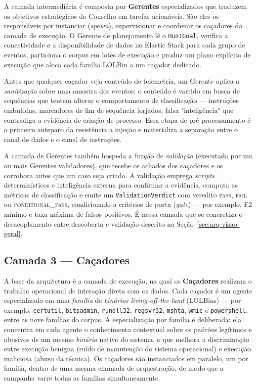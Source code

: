 A camada intermediária é composta por \textbf{Gerentes} especializados que
traduzem os objetivos estratégicos do Conselho em tarefas acionáveis. São eles os
responsáveis por instanciar (\emph{spawn}), supervisionar e coordenar os
caçadores da camada de execução. O Gerente de planejamento lê o \texttt{HuntGoal},
verifica a conectividade e a disponibilidade de dados no Elastic Stack para cada
grupo de eventos, particiona o corpus em lotes de execução e produz um plano
explícito de execução que aloca cada família LOLBin a um caçador dedicado.

Antes que qualquer caçador veja conteúdo de telemetria, um Gerente aplica a
\emph{sanitização} sobre uma amostra dos eventos: o conteúdo é varrido em busca de
sequências que tentem alterar o comportamento de classificação — instruções
embutidas, marcadores de fim de sequência forjados, falsa "inteligência" que
contradiga a evidência de criação de processo. Essa etapa de pré-processamento é o
primeiro anteparo da resistência a injeção e materializa a separação entre o
canal de dados e o canal de instruções.

A camada de Gerentes também hospeda a função de \emph{validação} (executada por um
ou mais Gerentes validadores), que recebe os achados dos caçadores e os
corrobora antes que um caso seja criado. A validação emprega \emph{scripts}
determinísticos e inteligência externa para confirmar a evidência, computa as
métricas de classificação e emite um \texttt{ValidationVerdict} com veredito
\textsc{pass}, \textsc{fail} ou \textsc{conditional\_pass}, condicionado a
critérios de porta (\emph{gate}) — por exemplo, F2 mínimo e taxa máxima de falsos
positivos. É nessa camada que se concretiza o desacoplamento entre descoberta e
validação descrito na Seção~\ref{sec:arq-visao-geral}.

\subsection{Camada 3 --- Caçadores}
\label{sec:arq-hunters}

A base da arquitetura é a camada de execução, na qual os \textbf{Caçadores}
realizam o trabalho operacional de interação direta com os dados. Cada caçador é
um agente especializado em uma \emph{família} de \emph{binários living-off-the-land}
(LOLBins) — por exemplo, \texttt{certutil}, \texttt{bitsadmin},
\texttt{rundll32}, \texttt{regsvr32}, \texttt{mshta}, \texttt{wmic} e
\texttt{powershell}, entre as nove famílias do corpus. A especialização por
família é deliberada: ela concentra em cada agente o conhecimento contextual
sobre os padrões legítimos e abusivos de um mesmo \emph{binário} nativo do
sistema, o que melhora a discriminação entre execução benigna (ruído de
manutenção do sistema operacional) e execução maliciosa (abuso da técnica). Os
caçadores são instanciados em paralelo, um por família, dentro de uma mesma
chamada de orquestração, de modo que a campanha varre todas as famílias
simultaneamente.

